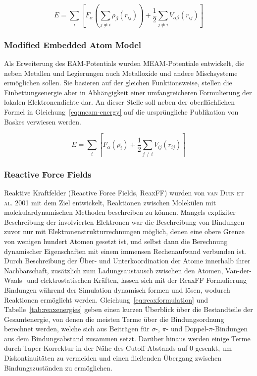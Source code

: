\begin{equation}
  \label{eq:eam-energy}
  E = \sum_i\left[F_\alpha\left(\sum_{j\neq i}{\rho_\beta\left(r_{ij}\right)}\right) + \frac{1}{2}\sum_{j\neq i}{V_{\alpha\beta}\left(r_{ij}\right)}\right]
\end{equation}

\subsubsection{Modified Embedded Atom Model}

Als Erweiterung des EAM-Potentials wurden MEAM-Potentiale entwickelt, die neben Metallen und Legierungen auch Metalloxide und andere Mischsysteme ermöglichen sollen\cite{baskes_modified_1992,baskes_modified_1996}.
Sie basieren auf der gleichen Funktionsweise, stellen die Einbettungsenergie aber in Abhängigkeit einer umfangreicheren Formulierung der lokalen Elektronendichte dar.
An dieser Stelle soll neben der oberflächlichen Formel in Gleichung~\ref{eq:meam-energy} auf die ursprüngliche Publikation von Baskes  verwiesen werden.

\begin{equation}
  \label{eq:meam-energy}
  E = \sum_i\left[F_\alpha\left(\bar{\rho_i}\right) + \frac{1}{2}\sum_{j\neq i}{V_{ij}\left(r_{ij}\right)}\right]
\end{equation}

\subsubsection{Reactive Force Fields}

Reaktive Kraftfelder (Reactive Force Fields, ReaxFF) wurden von \textsc{van Duin et al.}\cite{van_duin_reaxff:_2001} 2001 mit dem Ziel entwickelt, Reaktionen zwischen Molekülen mit molekulardynamischen Methoden beschreiben zu können.
Mangels expliziter Beschreibung der involvierten Elektronen war die Beschreibung von Bindungen zuvor nur mit Elektronenstrukturrechnungen möglich, denen eine obere Grenze von wenigen hundert Atomen gesetzt ist, und selbst dann die Berechnung dynamischer Eigenschaften mit einem immensen Rechenaufwand verbunden ist.
Durch Beschreibung der Über- und Unterkoordination der Atome innerhalb ihrer Nachbarschaft, zusätzlich zum Ladungsaustausch zwischen den Atomen, Van-der-Waals- und elektrostatischen Kräften, lassen sich mit der ReaxFF-Formulierung Bindungen während der Simulation dynamisch formen und lösen, wodurch Reaktionen ermöglicht werden.
Gleichung~\ref{eq:reaxformulation} und Tabelle~\ref{tab:reaxenergies} geben einen kurzen Überblick über die Bestandteile der Gesamtenergie, von denen die meisten Terme über die Bindungsordnung berechnet werden, welche sich aus Beiträgen für $\sigma$-, $\pi$- und Doppel-$\pi$-Bindungen aus dem Bindungsabstand zusammen setzt.
Darüber hinaus werden einige Terme durch Taper-Korrektur in der Nähe des Cutoff-Abstands auf 0 gesenkt, um Diskontinuitäten zu vermeiden und einen fließenden Übergang zwischen Bindungszuständen zu ermöglichen.

